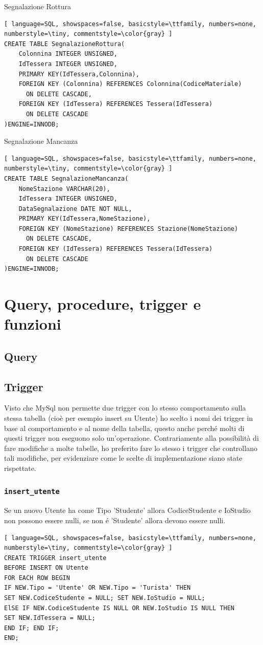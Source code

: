 \documentclass[a4paper,twoside]{article}
\begin{document}
Segnalazione Rottura
\begin{lstlisting}[ language=SQL, showspaces=false, basicstyle=\ttfamily, numbers=none, numberstyle=\tiny, commentstyle=\color{gray} ]
CREATE TABLE SegnalazioneRottura(
	Colonnina INTEGER UNSIGNED,
	IdTessera INTEGER UNSIGNED,
	PRIMARY KEY(IdTessera,Colonnina),
	FOREIGN KEY (Colonnina) REFERENCES Colonnina(CodiceMateriale)
	  ON DELETE CASCADE,
	FOREIGN KEY (IdTessera) REFERENCES Tessera(IdTessera)
	  ON DELETE CASCADE
)ENGINE=INNODB;
\end{lstlisting}
Segnalazione Mancanza
\begin{lstlisting}[ language=SQL, showspaces=false, basicstyle=\ttfamily, numbers=none, numberstyle=\tiny, commentstyle=\color{gray} ]
CREATE TABLE SegnalazioneMancanza(
	NomeStazione VARCHAR(20),
	IdTessera INTEGER UNSIGNED,
	DataSegnalazione DATE NOT NULL,
	PRIMARY KEY(IdTessera,NomeStazione),
	FOREIGN KEY (NomeStazione) REFERENCES Stazione(NomeStazione)
	  ON DELETE CASCADE,
	FOREIGN KEY (IdTessera) REFERENCES Tessera(IdTessera)
	  ON DELETE CASCADE
)ENGINE=INNODB;
\end{lstlisting}
\section{Query, procedure, trigger e funzioni} %
\subsection{Query}
\subsection{Trigger}
Visto che MySql non permette due trigger con lo stesso comportamento sulla stessa tabella (cioè per esempio insert su Utente) ho scelto i nomi dei trigger in base al comportamento e al nome della tabella, questo anche perché molti di questi trigger non eseguono solo un'operazione.\newline
Contrariamente alla possibilità di fare modifiche a molte tabelle, ho preferito fare lo stesso i trigger che controllano tali modifiche, per evidenziare come le scelte di implementazione siano state rispettate.
\subsubsection{\texttt{insert\_utente}}
Se un nuovo Utente ha come Tipo 'Studente' allora CodiceStudente e IoStudio non possono essere nulli, se non é 'Studente' allora devono essere nulli.
\begin{lstlisting}[ language=SQL, showspaces=false, basicstyle=\ttfamily, numbers=none, numberstyle=\tiny, commentstyle=\color{gray} ]
CREATE TRIGGER insert_utente
BEFORE INSERT ON Utente
FOR EACH ROW BEGIN
IF NEW.Tipo = 'Utente' OR NEW.Tipo = 'Turista' THEN
SET NEW.CodiceStudente = NULL; SET NEW.IoStudio = NULL;
ElSE IF NEW.CodiceStudente IS NULL OR NEW.IoStudio IS NULL THEN
SET NEW.IdTessera = NULL;
END IF; END IF;
END;
\end{lstlisting}
\end{document}
